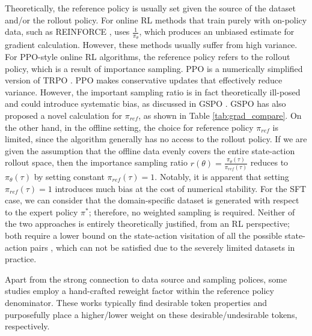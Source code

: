 \documentclass{article} %
\newcommand{\0}{\mathbb{0}}
\newcommand{\1}{\mathbb{1}}
\begin{document}
Theoretically, the reference policy is usually set given the source of the dataset and/or the rollout policy. 
For online RL methods that train purely with on-policy data, such as REINFORCE \citep{ahmadian2024back}, uses $\frac{1}{\pi_\theta}$, which produces an unbiased estimate for gradient calculation. However, these methods usually suffer from high variance.
For PPO-style online RL algorithms, the reference policy refers to the rollout policy, which is a result of importance sampling.
PPO is a numerically simplified version of TRPO \citep{schulman2015trust}. PPO makes conservative updates that effectively reduce variance. However, the important sampling ratio is in fact theoretically ill-posed and could introduce systematic bias, as discussed in GSPO \citep{zheng2025group}. GSPO has also proposed a novel calculation for $\pi_{ref}$, as shown in Table \ref{tab:grad_compare}.
On the other hand, in the offline setting, the choice for reference policy $\pi_{ref}$ is limited, since the algorithm generally has no access to the rollout policy. If we are given the assumption that the offline data evenly covers the entire state-action rollout space, then the importance sampling ratio $r(\theta) = \frac{\pi_\theta (\tau ) }{\pi_{ref} (\tau )}$ reduces to $\pi_\theta (\tau )$ by setting constant $\pi_{ref} (\tau ) = 1$. Notably, it is apparent that setting $\pi_{ref} (\tau ) = 1$ introduces much bias at the cost of numerical stability.
For the SFT case, we can consider that the domain-specific dataset is generated with respect to the expert policy $\pi^\ast$; therefore, no weighted sampling is required. 
Neither of the two approaches is entirely theoretically justified, from an RL perspective; both require a lower bound on the state-action visitation of all the possible state-action pairs \citep{kakade2003sample}, which can not be satisfied due to the severely limited datasets in practice.





Apart from the strong connection to data source and sampling polices, some studies employ a hand-crafted reweight factor within the reference policy denominator. These works \citep{yan2025learning, zhang2025policy} typically find desirable token properties and purposefully place a higher/lower weight on these desirable/undesirable tokens, respectively.
\end{document}
